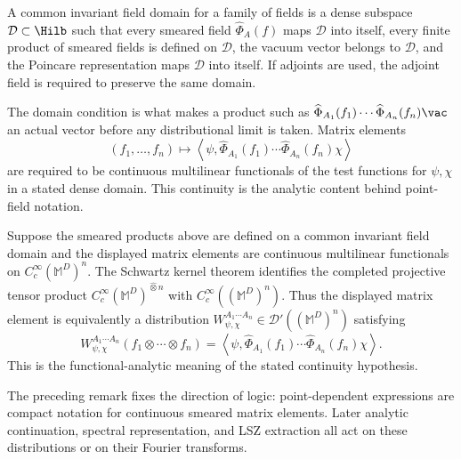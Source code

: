 \begin{definition}
\label{def:common-invariant-field-domain}
  A common invariant field domain for a family of fields is a dense subspace
  \(\mathcal D\subset\Hilb\) such that every smeared field
  \(\widehat\Phi_A(f)\) maps \(\mathcal D\) into itself, every finite product
  of smeared fields is defined on \(\mathcal D\), the vacuum vector belongs to
  \(\mathcal D\), and the Poincare representation maps \(\mathcal D\) into
  itself.  If adjoints are used, the adjoint field is required to preserve the
  same domain.
\end{definition}

The domain condition is what makes a product such as
\(\widehat\Phi_{A_1}(f_1)\cdots\widehat\Phi_{A_n}(f_n)\vac\) an actual
vector before any distributional limit is taken.  Matrix elements
\[
  (f_1,\ldots,f_n)
  \longmapsto
  \left\langle\psi,
  \widehat\Phi_{A_1}(f_1)\cdots\widehat\Phi_{A_n}(f_n)\chi
  \right\rangle
\]
are required to be continuous multilinear functionals of the test functions
for \(\psi,\chi\) in a stated dense domain.  This continuity is the analytic
content behind point-field notation.

\begin{remark}
\label{rem:distributional-matrix-elements}
  Suppose the smeared products above are defined on a common invariant field
  domain and the displayed matrix elements are continuous multilinear
  functionals on \(C_c^\infty(\mathbb M^D)^n\).  The Schwartz kernel theorem
  identifies the completed projective tensor product
  \(C_c^\infty(\mathbb M^D)^{\widehat\otimes n}\) with
  \(C_c^\infty((\mathbb M^D)^n)\).  Thus the displayed matrix element is
  equivalently a distribution
  \(W_{\psi,\chi}^{A_1\cdots A_n}\in\mathcal D'((\mathbb M^D)^n)\) satisfying
  \[
    W_{\psi,\chi}^{A_1\cdots A_n}(f_1\otimes\cdots\otimes f_n)
    =
    \left\langle\psi,
    \widehat\Phi_{A_1}(f_1)\cdots\widehat\Phi_{A_n}(f_n)\chi
    \right\rangle .
  \]
  This is the functional-analytic meaning of the stated continuity
  hypothesis.
\end{remark}

\begin{remark}
\label{rem:point-field-notation-direction}
The preceding remark fixes the direction of logic: point-dependent
expressions are compact notation for continuous smeared matrix elements.
Later analytic continuation, spectral representation, and LSZ extraction all
act on these distributions or on their Fourier transforms.
\end{remark}

